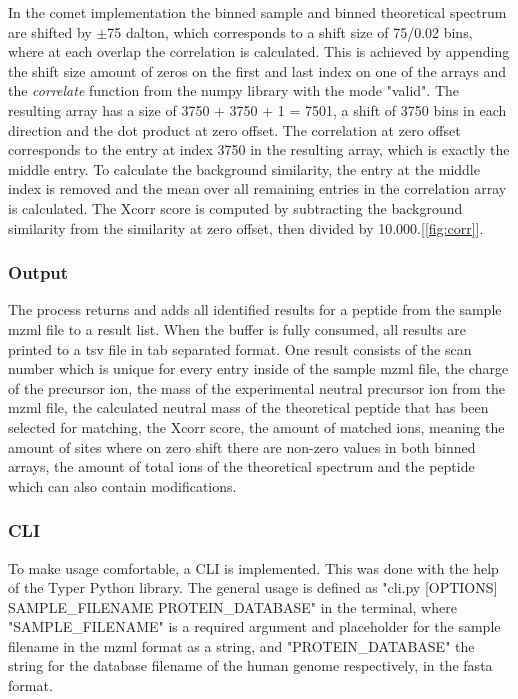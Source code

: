 \documentclass[11pt]{article}
\begin{document}
In the comet implementation the binned sample and binned theoretical spectrum are shifted by $\pm$75 dalton, which corresponds to a shift size of 75/0.02 bins, where at each overlap the correlation is calculated. This is achieved by appending the shift size amount of zeros on the first and last index on one of the arrays and the \textit{correlate} function from the numpy library with the mode "valid". The resulting array has a size of 3750 + 3750 + 1 = 7501, a shift of 3750 bins in each direction and the dot product at zero offset. The correlation at zero offset corresponds to the entry at index 3750 in the resulting array, which is exactly the middle entry. To calculate the background similarity, the entry at the middle index is removed and the mean over all remaining entries in the correlation array is calculated. The Xcorr score is computed by subtracting the background similarity from the similarity at zero offset, then divided by 10.000.[\cref{fig:corr}].

\subsubsection{Output}
The process returns and adds all identified results for a peptide from the sample mzml file to a result list. When the buffer is fully consumed, all results are printed to a tsv file in tab separated format. One result consists of the scan number which is unique for every entry inside of the sample mzml file, the charge of the precursor ion, the mass of the experimental neutral precursor ion from the mzml file, the calculated neutral mass of the theoretical peptide that has been selected for matching, the Xcorr score, the amount of matched ions, meaning the amount of sites where on zero shift there are non-zero values in both binned arrays, the amount of total ions of the theoretical spectrum and the peptide which can also contain modifications.

\subsubsection{CLI}
To make usage comfortable, a CLI is implemented. This was done with the help of the Typer Python library. The general usage is defined as "cli.py [OPTIONS] SAMPLE\_FILENAME PROTEIN\_DATABASE" in the terminal, where "SAMPLE\_FILENAME" is a required argument and placeholder for the sample filename in the mzml format as a string, and "PROTEIN\_DATABASE" the string for the database filename of the human genome respectively, in the fasta format. 
\end{document}
